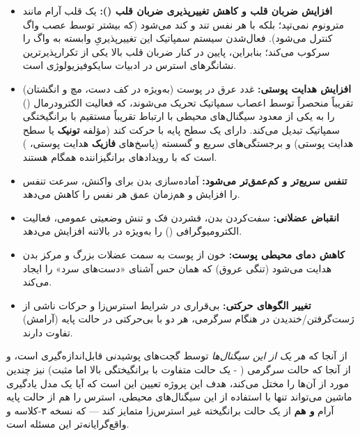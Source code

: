 \documentclass[12pt,a4paper]{article}
\begin{document}
\begin{itemize}
    \item \textbf{افزایش ضربان قلب و کاهش تغییرپذیری ضربان قلب ():} یک قلب آرام مانند مترونوم نمی‌تپد؛ بلکه با هر نفس تند و کند می‌شود (که بیشتر توسط عصب واگ کنترل می‌شود). فعال‌شدن سیستم سمپاتیک این تغییرپذیریِ وابسته به واگ را سرکوب می‌کند؛ بنابراین،  پایین در کنار ضربان قلب بالا یکی از تکرارپذیرترین نشانگرهای استرس در ادبیات سایکوفیزیولوژی است.
    \item \textbf{افزایش هدایت پوستی:} غدد عرق در پوست (به‌ویژه در کف دست، مچ و انگشتان) تقریباً منحصراً توسط اعصاب سمپاتیک تحریک می‌شوند، که فعالیت الکترودرمال () را به یکی از معدود سیگنال‌های محیطی با ارتباط تقریباً مستقیم با برانگیختگی سمپاتیک تبدیل می‌کند.  دارای یک سطح پایه با حرکت کند (مؤلفه \textbf{تونیک} یا سطح هدایت پوستی) و برجستگی‌های سریع و گسسته (پاسخ‌های \textbf{فازیک} هدایت پوستی، ) است که با رویدادهای برانگیزاننده همگام هستند.
    \item \textbf{تنفس سریع‌تر و کم‌عمق‌تر می‌شود:} آماده‌سازی بدن برای واکنش، سرعت تنفس را افزایش و هم‌زمان عمق هر نفس را کاهش می‌دهد.
    \item \textbf{انقباض عضلانی:} سفت‌کردن بدن، فشردن فک و تنش وضعیتی عمومی، فعالیت الکترومیوگرافی () را به‌ویژه در بالاتنه افزایش می‌دهد.
    \item \textbf{کاهش دمای محیطی پوست:} خون از پوست به سمت عضلات بزرگ و مرکز بدن هدایت می‌شود (تنگی عروق) که همان حس آشنای «دست‌های سرد» را ایجاد می‌کند.
    \item \textbf{تغییر الگوهای حرکتی:} بی‌قراری در شرایط استرس‌زا و حرکات ناشی از ژست‌گرفتن/خندیدن در هنگام سرگرمی، هر دو با بی‌حرکتی در حالت پایه (آرامش) تفاوت دارند.
\end{itemize}

از آنجا که \textit{هر یک از این سیگنال‌ها} توسط گجت‌های پوشیدنی قابل‌اندازه‌گیری است، و از آنجا که حالت سرگرمی ( - یک حالت متفاوت با برانگیختگی بالا اما مثبت) نیز چندین مورد از آن‌ها را مختل می‌کند، هدف این پروژه تعیین این است که آیا یک مدل یادگیری ماشین می‌تواند تنها با استفاده از این سیگنال‌های محیطی، استرس را هم از حالت پایه آرام \textbf{و هم} از یک حالت برانگیخته غیر استرس‌زا متمایز کند — که نسخه ۳-کلاسه و واقع‌گرایانه‌تر این مسئله است.
\end{document}
